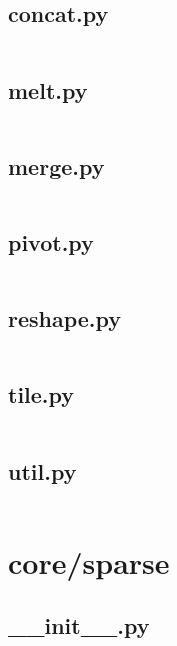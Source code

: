 \documentclass{article}
\begin{document}
\subsection{concat.py}
\inputminted{python}{/home/dufferzafar/dev/@clones/pandas/pandas/core/reshape/concat.py}
\newpage

\subsection{melt.py}
\inputminted{python}{/home/dufferzafar/dev/@clones/pandas/pandas/core/reshape/melt.py}
\newpage

\subsection{merge.py}
\inputminted{python}{/home/dufferzafar/dev/@clones/pandas/pandas/core/reshape/merge.py}
\newpage

\subsection{pivot.py}
\inputminted{python}{/home/dufferzafar/dev/@clones/pandas/pandas/core/reshape/pivot.py}
\newpage

\subsection{reshape.py}
\inputminted{python}{/home/dufferzafar/dev/@clones/pandas/pandas/core/reshape/reshape.py}
\newpage

\subsection{tile.py}
\inputminted{python}{/home/dufferzafar/dev/@clones/pandas/pandas/core/reshape/tile.py}
\newpage

\subsection{util.py}
\inputminted{python}{/home/dufferzafar/dev/@clones/pandas/pandas/core/reshape/util.py}
\newpage

\section{core/sparse}

\subsection{\_\_init\_\_.py}
\inputminted{python}{/home/dufferzafar/dev/@clones/pandas/pandas/core/sparse/__init__.py}
\newpage
\end{document}
